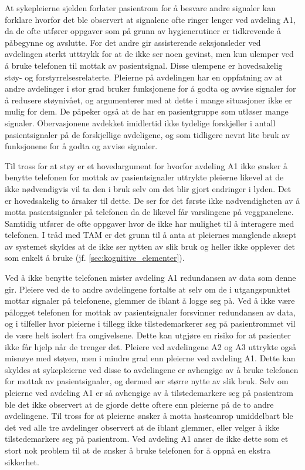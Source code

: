 \noindent
At sykepleierne sjelden forlater pasientrom for å besvare andre signaler kan forklare hvorfor det ble observert at signalene ofte ringer lenger ved avdeling A1, da de ofte utfører oppgaver som på grunn av hygienerutiner er tidkrevende å påbegynne og avslutte. For det andre gir assisterende seksjonsleder ved avdelingen sterkt utttrykk for at de ikke ser noen gevinst, men kun ulemper ved å bruke telefonen til mottak av pasientsignal. Disse ulempene er hovedsakelig støy- og forstyrrelsesrelaterte. Pleierne på avdelingen har en oppfatning av at andre avdelinger i stor grad bruker funksjonene for å godta og avvise signaler for å redusere støynivået, og argumenterer med at dette i mange situasjoner ikke er mulig for dem. De påpeker også at de har en pasientgruppe som utløser mange signaler. Obervasjonene avdekket imidlertid ikke tydelige forskjeller i antall pasientsignaler på de forskjellige avdeligene, og som tidligere nevnt lite bruk av funksjonene for å godta og avvise signaler.

\noindent 
Til tross for at støy er et hovedargument for hvorfor avdeling A1 ikke ønsker å benytte telefonen for mottak av pasientsignaler uttrykte pleierne likevel at de ikke nødvendigvis vil ta den i bruk selv om det blir gjort endringer i lyden. Det er hovedsakelig to årsaker til dette. De ser for det første ikke nødvendigheten av å motta pasientsignaler på telefonen da de likevel får varslingene på veggpanelene. Samtidig utfører de ofte oppgaver hvor de ikke har mulighet til å interagere med telefonen. I tråd med TAM er det grunn til å anta at pleiernes manglende aksept av systemet skyldes at de ikke ser nytten av slik bruk og heller ikke opplever det som enkelt å bruke (jf. \ref{sec:kognitive_elementer}).

\noindent
Ved å ikke benytte telefonen mister avdeling A1 redundansen av data som denne gir.
Pleiere ved de to andre avdelingene fortalte at selv om de i utgangspunktet mottar signaler på telefonene, glemmer de iblant å logge seg på. Ved å ikke være pålogget telefonen for mottak av pasientsignaler forsvinner redundansen av data, og i tilfeller hvor pleierne i tillegg ikke tilstedemarkerer seg på pasientrommet vil de være helt isolert fra omgivelsene. Dette kan utgjøre en risiko for at pasienter ikke får hjelp når de trenger det. Pleiere ved avdelingene A2 og A3 uttrykte også misnøye med støyen, men i mindre grad enn pleierne ved avdeling A1. Dette kan skyldes at sykepleierne ved disse to avdelingene er avhengige av å bruke telefonen for mottak av pasientsignaler, og dermed ser større nytte av slik bruk. Selv om pleierne ved avdeling A1 er så avhengige av å tilstedemarkere seg på pasientrom ble det ikke observert at de gjorde dette oftere enn pleierne på de to andre avdelingene. Til tross for at pleierne ønsker å motta hasteanrop umiddelbart ble det ved alle tre avdelinger observert at de iblant glemmer, eller velger å ikke tilstedemarkere seg på pasientrom. Ved avdeling A1 anser de ikke dette som et stort nok problem til at de ønsker å bruke telefonen for å oppnå en ekstra sikkerhet. 


